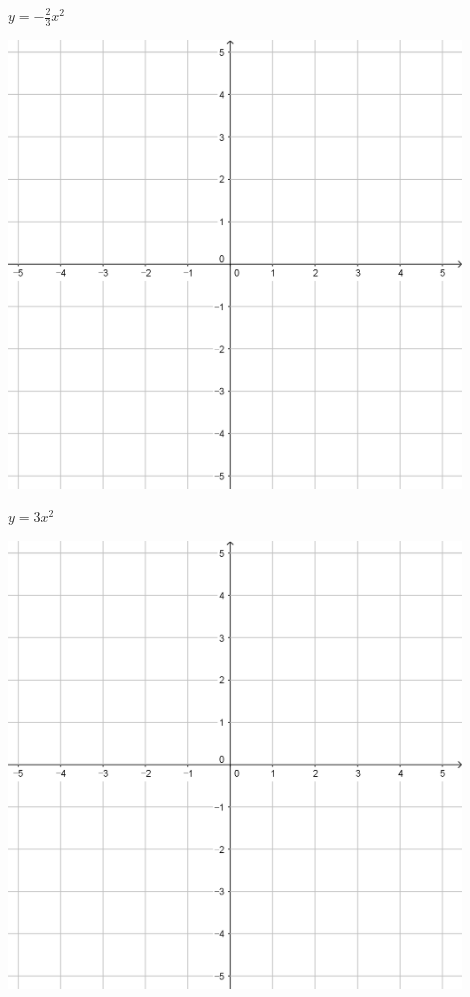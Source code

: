 \documentclass{oblivoir}
\begin{document}
\begin{minipage}{0.45\textwidth}\centering
\(y=-\frac23x^2\)
\par\bigskip\includegraphics[width=0.9\textwidth]{55}
\end{minipage}
\begin{minipage}{0.45\textwidth}\centering
\(y=3x^2\)
\par\bigskip\includegraphics[width=0.9\textwidth]{55}
\end{minipage}\bigskip\bigskip\par
\end{document}
